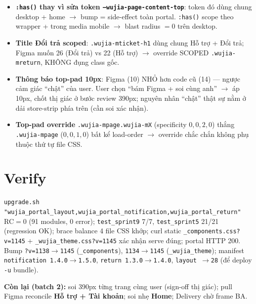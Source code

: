 \begin{itemize}
  \item \textbf{\texttt{:has()} thay vì sửa token \texttt{--wujia-page-content-top}}: token đó dùng chung
        desktop + home $\rightarrow$ bump = side-effect toàn portal. \texttt{:has()} scope theo wrapper +
        trong media mobile $\rightarrow$ blast radius $= 0$ trên desktop.
  \item \textbf{Title Đổi trả scoped}: \texttt{.wujia-mticket-h1} dùng chung Hỗ trợ + Đổi trả; Figma muốn
        26 (Đổi trả) vs 22 (Hỗ trợ) $\rightarrow$ override SCOPED \texttt{.wujia-mreturn}, KHÔNG đụng class gốc.
  \item \textbf{Thông báo top-pad 10px}: Figma (10) NHỎ hơn code cũ (14) --- ngược cảm giác ``chật'' của user.
        User chọn ``bám Figma + soi cùng anh'' $\rightarrow$ áp 10px, chốt thị giác ở bước review 390px;
        nguyên nhân ``chật'' thật sự nằm ở dải store-strip phía trên (cần soi xác nhận).
  \item \textbf{Top-pad override} \texttt{.wujia-mpage.wujia-mX} (specificity $0,0,2,0$) thắng \texttt{.wujia-mpage}
        ($0,0,1,0$) bất kể load-order $\rightarrow$ override chắc chắn không phụ thuộc thứ tự file CSS.
\end{itemize}

\section{Verify}

\texttt{upgrade.sh "wujia\_portal\_layout,wujia\_portal\_notification,wujia\_portal\_return"} RC$=0$ (91 modules,
0 error); \texttt{test\_sprint9} 7/7, \texttt{test\_sprint5} 21/21 (regression OK); brace balance 4 file CSS
khớp; curl static \texttt{\_components.css?v=1145} + \texttt{\_wujia\_theme.css?v=1145} xác nhận serve đúng;
portal HTTP 200. Bump \texttt{?v=1138$\to$1145} (\texttt{\_components}), \texttt{1134$\to$1145}
(\texttt{\_wujia\_theme}); manifest \texttt{notification 1.4.0$\to$1.5.0}, \texttt{return 1.3.0$\to$1.4.0},
\texttt{layout $\to$28} (để deploy \texttt{-u} bundle).

\textbf{Còn lại (batch 2):} soi 390px từng trang cùng user (sign-off thị giác); pull Figma reconcile
\textbf{Hỗ trợ + Tài khoản}; soi nhẹ \textbf{Home}; Delivery chờ frame BA.
